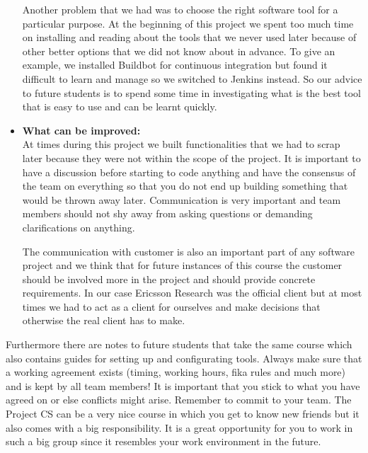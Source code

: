 \begin{itemize}
Another problem that we had was to choose the right software tool for a particular purpose. At the 
beginning of this project we spent too much time on installing and reading about the tools that we never 
used later because of other better options that we did not know about in advance. To give an example, we installed Buildbot for continuous integration but found 
it difficult to learn and manage so we switched to Jenkins instead. So our advice to future students is to 
spend some time in investigating what is the best tool that is easy to use and can be learnt quickly.

\item{\textbf{What can be improved:}}\\
 At times during this project we built functionalities that we had to scrap later because they were not 
 within the scope of the project. It is important to have a discussion before starting to code anything 
 and have the consensus of the team on everything so that you do not end up building something that would 
 be thrown away later. Communication is very important and team members should not shy away from asking 
 questions or demanding clarifications on anything.  
 
The communication with customer is also an important part of any software project and we think that 
for future instances of this course the customer should be involved more in the project and should 
provide concrete requirements. In our case Ericsson Research was the official client 
but at most times we had to act as a client for ourselves and make decisions that otherwise the real 
client has to make. 
\end{itemize}

Furthermore there are notes to future students that take the same course which also contains guides for setting up and configurating tools.
Always make sure that a working agreement exists (timing, working hours, fika rules and much more) and
is kept by all team members! It is important that you stick to what you have agreed on or else
conflicts might arise. 
Remember to commit to your team. The Project CS can be a very nice course in which you
get to know new friends but it also comes with a big responsibility.
It is a great opportunity for you to work in such a big group since
it resembles your work environment in the future.

